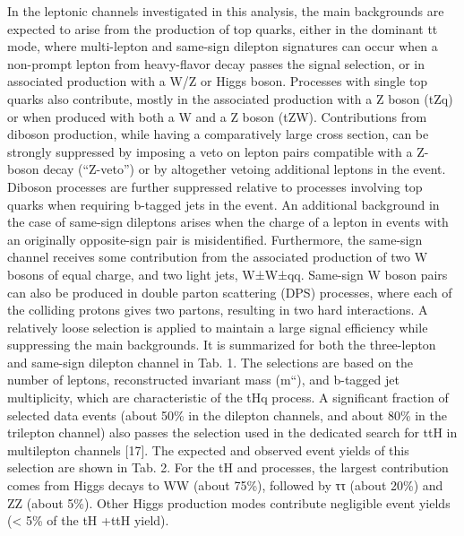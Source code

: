 In the leptonic channels investigated in this analysis, the main backgrounds are expected to arise from the production of top quarks, either in the dominant tt mode, where multi-lepton and same-sign dilepton signatures can occur when a non-prompt lepton from heavy-flavor decay passes the signal selection, or in associated production with a W/Z or Higgs boson. Processes with single top quarks also contribute, mostly in the associated production with a Z boson (tZq) or when produced with both a W and a Z boson (tZW). Contributions from diboson production, while having a comparatively large cross section, can be strongly suppressed by imposing a veto on lepton pairs compatible with a Z-boson decay (“Z-veto”) or by altogether vetoing additional leptons in the event. Diboson processes are further suppressed relative to processes involving top quarks when requiring b-tagged jets in the event. An additional background in the case of same-sign dileptons arises when the charge of a lepton in events with an originally opposite-sign pair is misidentified. Furthermore, the same-sign channel receives some contribution from the associated production of two W bosons of equal charge, and two light jets, W±W±qq. Same-sign W boson pairs can also be produced in double parton scattering (DPS) processes, where each of the colliding protons gives two partons, resulting in two hard interactions. A relatively loose selection is applied to maintain a large signal efficiency while suppressing the main backgrounds. It is summarized for both the three-lepton and same-sign dilepton channel in Tab. 1. The selections are based on the number of leptons, reconstructed invariant mass (m``), and b-tagged jet multiplicity, which are characteristic of the tHq process. A significant fraction of selected data events (about 50\% in the dilepton channels, and about 80\% in the trilepton channel) also passes the selection used in the dedicated search for ttH in multilepton channels [17]. The expected and observed event yields of this selection are shown in Tab. 2. For the tH and \ttH processes, the largest contribution comes from Higgs decays to WW (about 75\%), followed  by ττ (about 20\%) and ZZ (about 5\%). Other Higgs production modes contribute negligible event yields (< 5\% of the tH +ttH yield).











